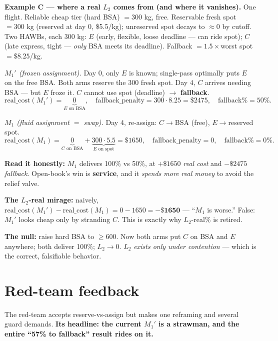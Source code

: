 \documentclass[11pt]{article}
\begin{document}
\begin{mdframed}[backgroundcolor=blue!4,linewidth=0.4pt]
\textbf{Example C --- where a real $L_2$ comes from (and where it vanishes).}
One flight. Reliable cheap tier (hard BSA) $=300$ kg, free. Reservable fresh spot $=300$ kg (reserved at
day 0, \$5.5/kg); unreserved spot decays to $\approx0$ by cutoff. Two HAWBs, each 300 kg:
$E$ (early, flexible, loose deadline --- can ride spot); $C$ (late express, tight --- \emph{only} BSA meets
its deadline). Fallback $=1.5\times$worst spot $=\$8.25$/kg.
\smallskip

\emph{$M_1'$ (frozen assignment).} Day 0, only $E$ is known; single-pass optimally puts $E$ on the free
BSA. Both arms reserve the 300 fresh spot. Day 4, $C$ arrives needing BSA --- but $E$ froze it.
$C$ cannot use spot (deadline) $\to$ \textbf{fallback}.
\[
\text{real\_cost}(M_1')=\underbrace{0}_{E\text{ on BSA}},\quad \text{fallback\_penalty}=300\cdot8.25=\$2475,\quad \text{fallback\%}=50\%.
\]

\emph{$M_1$ (fluid assignment $=$ swap).} Day 4, re-assign: $C\!\to\!$BSA (free), $E\!\to\!$reserved spot.
\[
\text{real\_cost}(M_1)=\underbrace{0}_{C\text{ on BSA}}+\underbrace{300\cdot5.5}_{E\text{ on spot}}=\$1650,\quad \text{fallback\_penalty}=0,\quad \text{fallback\%}=0\%.
\]

\textbf{Read it honestly:} $M_1$ delivers 100\% vs 50\%, at \emph{$+\$1650$ real cost} and
\emph{$-\$2475$ fallback}. Open-book's win is \textbf{service}, and it \emph{spends more real money} to
avoid the relief valve.

\textbf{The $L_2$-real mirage:} naively, $\text{real\_cost}(M_1')-\text{real\_cost}(M_1)=0-1650=\mathbf{-\$1650}$
--- ``$M_1$ is worse.'' False: $M_1'$ looks cheap only by stranding $C$. This is exactly why $L_2$-real\%
is retired.

\textbf{The null:} raise hard BSA to $\ge600$. Now both arms put $C$ on BSA and $E$ anywhere; both deliver
100\%; $L_2\to0$. \emph{$L_2$ exists only under contention} --- which is the correct, falsifiable behavior.
\end{mdframed}

\section{Red-team feedback}\label{sec:redteam}

The red-team accepts reserve-vs-assign but makes one reframing and several guard demands. \textbf{Its
headline: the current $M_1'$ is a strawman, and the entire ``57\% to fallback'' result rides on it.}
\end{document}
